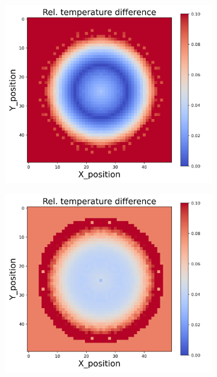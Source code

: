 {\begin{figure}[h]
\begin{minipage}{\textwidth}
\begin{subfigure}{0.27\textwidth}
        \end{subfigure}
        \begin{subfigure}{0.27\textwidth}
            \centering
            \includegraphics[width=\textwidth]{figures/raw_data/23/exp/T_bias.jpg}
        \end{subfigure}
        \begin{subfigure}{0.27\textwidth}
            \centering
            \includegraphics[width=\textwidth]{figures/raw_data/24/exp/T_bias.jpg}

\end{subfigure}
\end{minipage}
\end{figure}}
